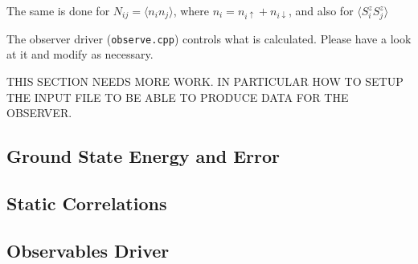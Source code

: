 \documentclass[paper=letter]{scrartcl}
\begin{document}
The same is done for $N_{ij} = \langle n_{i}n_{j}\rangle$, where $n_i = n_{i\uparrow}+n_{i\downarrow}$, and also for $\langle S_{i}^zS_{j}^z\rangle$

The observer driver (\verb=observe.cpp=) controls what is calculated. Please have a look at it and modify as necessary.

THIS SECTION NEEDS MORE WORK. IN PARTICULAR HOW TO SETUP THE INPUT FILE TO BE ABLE TO PRODUCE DATA FOR THE OBSERVER.


\subsection{Ground State Energy and Error}
\subsection{Static Correlations}
\subsection{Observables Driver}
\end{document}
